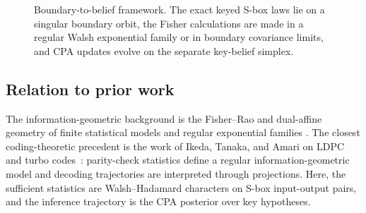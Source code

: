 \documentclass[referee,lineno,pdflatex,sn-mathphys-num]{sn-jnl}
\theoremstyle{thmstylethree}
\theoremstyle{thmstyletwo}
\theoremstyle{thmstyleone}
\begin{document}
\begin{figure}[t]
\centering
{}
\caption{Boundary-to-belief framework. The exact keyed S-box laws lie on a
singular boundary orbit, the Fisher calculations are made in a regular Walsh
exponential family or in boundary covariance limits, and CPA updates evolve on
the separate key-belief simplex.}
\label{fig:framework}
\end{figure}

\subsection{Relation to prior work}

The information-geometric background is the Fisher--Rao and dual-affine
geometry of finite statistical models and regular exponential families
\cite{amari2000methods,ay2017information,chentsov1982statistical}.  The
closest coding-theoretic precedent is the work of Ikeda, Tanaka, and Amari on
LDPC and turbo codes~\cite{ikeda2004information}: parity-check statistics
define a regular information-geometric model and decoding trajectories are
interpreted through projections.  Here, the sufficient statistics are
Walsh--Hadamard characters on S-box input-output pairs, and the inference
trajectory is the CPA posterior over key hypotheses.
\end{document}
